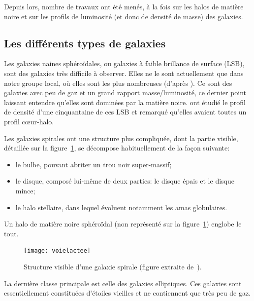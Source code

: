 			Depuis lors, nombre de travaux ont été menés, à la fois sur les halos de
			matière noire et sur les profils de luminosité (et donc de densité de masse)
			des galaxies.

		\subsection{Les différents types de galaxies}

			Les galaxies naines sphéroïdales, ou galaxies à faible brillance de surface (LSB), sont des
			galaxies très difficile à observer. Elles ne le sont actuellement que dans notre groupe local,
			où elles sont les plus nombreuses (d'après \citet{2013MNRAS.429.3068T}). Ce sont des galaxies
			avec peu de gaz et un grand rapport masse/luminosité, ce dernier point laissant entendre qu'elles
			sont dominées par la matière noire. \cite{2001ApJ...552L..23D} ont étudié le profil
			de densité d'une cinquantaine de ces LSB et remarqué qu'elles avaient toutes un profil cœur-halo.

			Les galaxies spirales ont une structure plus compliquée, dont la partie visible, détaillée sur la
			figure~\ref{Fig::Intro::schemaGS}, se décompose  habituellement de la façon suivante:
			\begin{itemize}
				\item le bulbe, pouvant abriter un trou noir super-massif;
				\item le disque, composé lui-même de deux parties: le disque épais
					et le disque mince;
				\item le halo stellaire, dans lequel évoluent notamment les amas globulaires.
			\end{itemize}
			Un halo de matière noire sphéroïdal (non représenté sur la figure~\ref{Fig::Intro::schemaGS}) englobe le tout.

			\begin{figure}[h]
				\begin{center}
					\texttt{[image: voielactee]}
				\end{center}
				\caption{Structure visible d'une galaxie spirale (figure extraite de~\citet{CoursJP}).\label{Fig::Intro::schemaGS}}
			\end{figure}

			La dernière classe principale est celle des galaxies elliptiques. Ces galaxies sont essentiellement
			constituées d'étoiles vieilles et ne contiennent que très
			peu de gaz.

